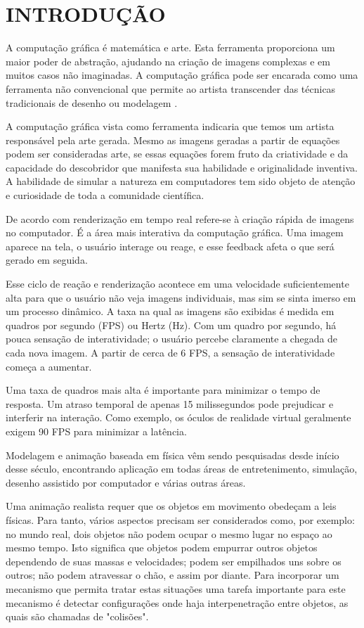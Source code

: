 \chapter{INTRODUÇÃO}

A computação gráfica é matemática e arte. Esta ferramenta proporciona um maior poder de abstração, ajudando na criação de imagens complexas e em muitos casos não imaginadas. A computação gráfica pode ser encarada como uma ferramenta não convencional que permite ao artista transcender das técnicas tradicionais de desenho ou modelagem \cite{azevedo2003}.

A computação gráfica vista como ferramenta indicaria que temos um artista responsável pela arte gerada. Mesmo as imagens geradas a partir de equações podem ser consideradas arte, se essas equações forem fruto da criatividade e da capacidade do descobridor que manifesta sua habilidade e originalidade inventiva. A habilidade de simular a natureza em computadores tem sido objeto de atenção e curiosidade de toda a comunidade científica.

De acordo com  renderização em tempo real refere-se à criação rápida de imagens no computador. É a área mais interativa da computação gráfica. Uma imagem aparece na tela, o usuário interage ou reage, e esse feedback afeta o que será gerado em seguida.

Esse ciclo de reação e renderização acontece em uma velocidade suficientemente alta para que o usuário não veja imagens individuais, mas sim se sinta imerso em um processo dinâmico. A taxa na qual as imagens são exibidas é medida em quadros por segundo (FPS) ou Hertz (Hz). Com um quadro por segundo, há pouca sensação de interatividade; o usuário percebe claramente a chegada de cada nova imagem. A partir de cerca de 6 FPS, a sensação de interatividade começa a aumentar.

Uma taxa de quadros mais alta é importante para minimizar o tempo de resposta. Um atraso temporal de apenas 15 milissegundos pode prejudicar e interferir na interação. Como exemplo, os óculos de realidade virtual geralmente exigem 90 FPS para minimizar a latência.

Modelagem e animação baseada em física vêm sendo pesquisadas desde início desse século, encontrando aplicação em todas áreas de entretenimento, simulação, desenho assistido por computador e várias outras áreas.

Uma animação realista requer que os objetos em movimento obedeçam a leis físicas. Para tanto, vários aspectos precisam ser considerados como, por exemplo: no mundo real, dois objetos não podem ocupar o mesmo lugar no espaço ao mesmo tempo. Isto significa que objetos podem empurrar outros objetos dependendo de suas massas e velocidades; podem ser empilhados uns sobre os outros; não podem atravessar o chão, e assim por diante. Para incorporar um mecanismo que permita tratar estas situações uma tarefa importante para este mecanismo é detectar configurações onde haja interpenetração entre objetos, as quais são chamadas de "colisões". 


